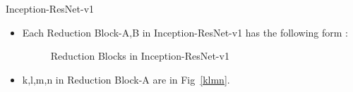\documentclass{beamer}
\begin{document}
\begin{frame}{Inception-ResNet-v1}
	\begin{itemize}
		\item Each Reduction Block-A,B in Inception-ResNet-v1 has the following form :
		\vspace{5pt}
		\begin{figure}[h]		
			\centering
			\quad
			\caption{Reduction Blocks in Inception-ResNet-v1}
			\label{Reduction Blocks v1}
		\end{figure}
		\vspace{5pt}
		\item k,l,m,n in Reduction Block-A are in Fig~\ref{klmn}.
	\end{itemize}
\end{frame}
\end{document}
